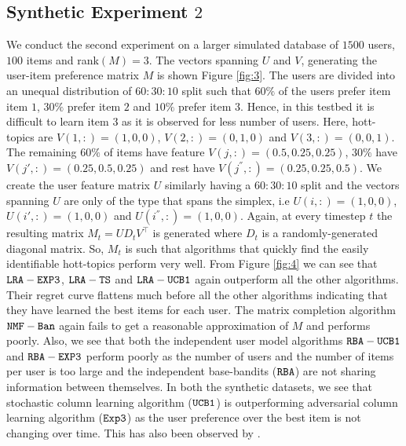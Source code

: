 \subsection{Synthetic Experiment $2$}
We conduct the second experiment on a larger simulated database of $1500$ users, $100$ items and rank$(M)=3$. The vectors spanning $U$ and $V$, generating the user-item preference matrix $M$ is shown Figure \ref{fig:3}. The users are divided into an unequal distribution of $60:30:10$ split such that $60\%$ of the users prefer item item $1$, $30\%$ prefer item $2$ and $10\%$ prefer item $3$. Hence, in this testbed it is difficult to learn item $3$ as it is observed for less number of users. Here, hott-topics are $V(1,:) = (1,0,0)$, $V(2,:) = (0,1, 0)$ and $V(3,:) = (0,0,1)$. The remaining $60\%$ of items have feature  $V(j,:) = (0.5, 0.25,0.25)$, $30\%$ have $V(j',:) = (0.25, 0.5, 0.25)$ and rest have $V(j^{''},:) = (0.25, 0.25, 0.5)$. We create the user feature matrix $U$ similarly having a $60:30:10$ split and the vectors spanning $U$ are only of the type that spans the simplex, i.e $U(i,:)=(1,0,0)$, $U(i',:)=(1,0,0)$ and $U(i^{''},:)=(1,0,0)$. Again, at every timestep $t$ the resulting matrix $M_t =UD_tV^{\intercal}$ is generated where $D_t$ is a randomly-generated diagonal matrix. So, $M_t$ is  such that algorithms that quickly find the easily identifiable hott-topics perform very well. From Figure \ref{fig:4} we can see that ${\tt LRA-EXP3}$, ${\tt LRA-TS}$ and ${\tt LRA-UCB1}$ again outperform all the other algorithms. Their regret curve flattens much before all the other algorithms indicating that they have learned the best items for each user. The matrix completion algorithm ${\tt NMF-Ban}$ again fails to get a reasonable approximation of $M$ and performs poorly. Also, we see that both the independent user model algorithms ${\tt RBA-UCB1}$ and ${\tt RBA-EXP3}$ perform poorly as the number of users and the number of items per user is too large and the independent base-bandits (${\tt RBA}$) are not sharing information between themselves. In both the synthetic datasets, we see that stochastic column learning algorithm (${\tt UCB1}$) is outperforming adversarial column learning algorithm (${\tt Exp3}$) as the user preference over the best item is not changing over time. This has also been observed by \citet{radlinski2008learning}.



